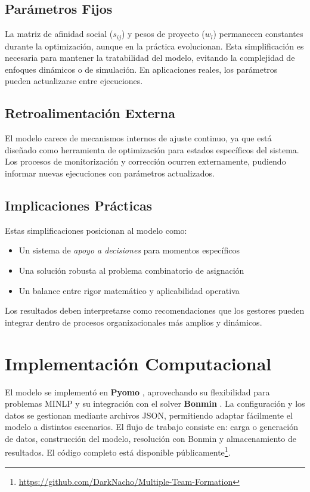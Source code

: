 \documentclass[conference]{IEEEtran}
\begin{document}
\subsection{Parámetros Fijos}
La matriz de afinidad social ($s_{ij}$) y pesos de proyecto ($w_l$) permanecen constantes durante la optimización, aunque en la práctica evolucionan. Esta simplificación es necesaria para mantener la tratabilidad del modelo, evitando la complejidad de enfoques dinámicos o de simulación. En aplicaciones reales, los parámetros pueden actualizarse entre ejecuciones.

\subsection{Retroalimentación Externa}
El modelo carece de mecanismos internos de ajuste continuo, ya que está diseñado como herramienta de optimización para estados específicos del sistema. Los procesos de monitorización y corrección ocurren externamente, pudiendo informar nuevas ejecuciones con parámetros actualizados.

\subsection{Implicaciones Prácticas}
Estas simplificaciones posicionan al modelo como:
\begin{itemize}
\item Un sistema de \textit{apoyo a decisiones} para momentos específicos
\item Una solución robusta al problema combinatorio de asignación
\item Un balance entre rigor matemático y aplicabilidad operativa
\end{itemize}

Los resultados deben interpretarse como recomendaciones que los gestores pueden integrar dentro de procesos organizacionales más amplios y dinámicos.

\section{Implementación Computacional}

El modelo se implementó en \textbf{Pyomo} \cite{pyomo_hart2011}, aprovechando su flexibilidad para problemas MINLP y su integración con el solver \textbf{Bonmin} \cite{bonmin_bonami2008}. La configuración y los datos se gestionan mediante archivos JSON, permitiendo adaptar fácilmente el modelo a distintos escenarios. El flujo de trabajo consiste en: carga o generación de datos, construcción del modelo, resolución con Bonmin y almacenamiento de resultados. El código completo está disponible públicamente\footnote{\url{https://github.com/DarkNacho/Multiple-Team-Formation}}.
\end{document}
